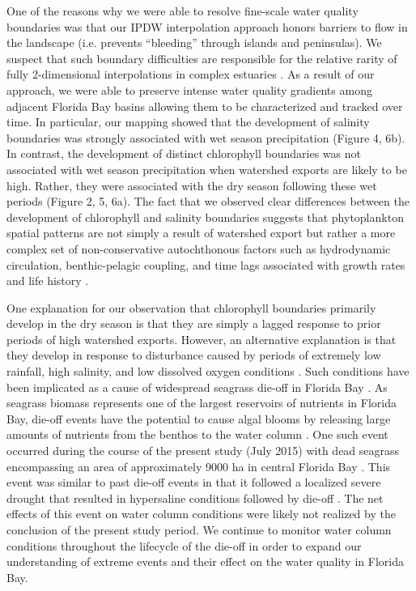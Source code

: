 \documentclass[review]{elsarticle}
\begin{document}
One of the reasons why we were able to resolve fine-scale water quality boundaries was that our IPDW interpolation approach honors barriers to flow in the landscape (i.e. prevents “bleeding” through islands and peninsulas). We suspect that such boundary difficulties are responsible for the relative rarity of fully 2-dimensional interpolations in complex estuaries \citep{lane_effects_2007, roman2005seasonal, du2010characteristics}. As a result of our approach, we were able to preserve intense water quality gradients among adjacent Florida Bay basins allowing them to be characterized and tracked over time. In particular, our mapping showed that the development of salinity boundaries was strongly associated with wet season precipitation (Figure 4, 6b). In contrast, the development of distinct chlorophyll boundaries was not associated with wet season precipitation when watershed exports are likely to be high. Rather, they were associated with the dry season following these wet periods (Figure 2, 5, 6a). The fact that we observed clear differences between the development of chlorophyll and salinity boundaries suggests that phytoplankton spatial patterns are not simply a result of watershed export but rather a more complex set of non-conservative autochthonous factors such as hydrodynamic circulation, benthic-pelagic coupling, and time lags associated with growth rates and life history \citep[Figure 6;][]{zhang_2014, lawrence2004wind}.

One explanation for our observation that chlorophyll boundaries primarily develop in the dry season is that they are simply a lagged response to prior periods of high watershed exports. However, an alternative explanation is that they develop in response to disturbance caused by periods of extremely low rainfall, high salinity, and low dissolved oxygen conditions \citep{hall2016recurrence}. Such conditions have been implicated as a cause of widespread seagrass die-off in Florida Bay \citep{borum2005potential, zieman1999seagrass}. As seagrass biomass represents one of the largest reservoirs of nutrients in Florida Bay, die-off events have the potential to cause algal blooms by releasing large amounts of nutrients from the benthos to the water column \citep{fourqurean2012carbon, zhang2004potential}. One such event occurred during the course of the present study (July 2015) with dead seagrass encompassing an area of approximately 9000 ha in central Florida Bay \citep{hall2016recurrence}. This event was similar to past die-off events in that it followed a localized severe drought that resulted in hypersaline conditions followed by die-off \citep[Figure 4;][]{robblee1991mass}. The net effects of this event on water column conditions were likely not realized by the conclusion of the present study period. We continue to monitor water column conditions throughout the lifecycle of the die-off in order to expand our understanding of extreme events and their effect on the water quality in Florida Bay.
\end{document}
